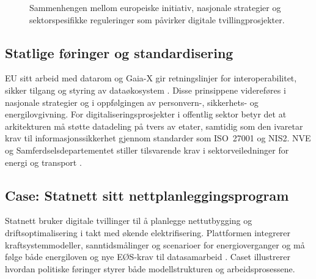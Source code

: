 \begin{figure}[ht]
    \centering
    \resizebox{0.9\textwidth}{!}{}
    \caption{Sammenhengen mellom europeiske initiativ, nasjonale strategier og sektorspesifikke reguleringer som påvirker digitale tvillingprosjekter.}
    \label{fig:kap02-politikk}
\end{figure}

\subsection{Statlige føringer og standardisering}
EU sitt arbeid med datarom og Gaia-X gir retningslinjer for interoperabilitet, sikker tilgang og styring av dataøkosystem \citep{eu2020circulareconomy}. Disse prinsippene videreføres i nasjonale strategier og i oppfølgingen av personvern-, sikkerhets- og energilovgivning. For digitaliseringsprosjekter i offentlig sektor betyr det at arkitekturen må støtte datadeling på tvers av etater, samtidig som den ivaretar krav til informasjonssikkerhet gjennom standarder som ISO~27001 og NIS2. NVE og Samferdselsdepartementet stiller tilsvarende krav i sektorveiledninger for energi og transport \citep{nve2023nettplan,avinor2022digital}.

\subsection{Case: Statnett sitt nettplanleggingsprogram}
Statnett bruker digitale tvillinger til å planlegge nettutbygging og driftsoptimalisering i takt med økende elektrifisering. Plattformen integrerer kraftsystemmodeller, sanntidsmålinger og scenarioer for energioverganger og må følge både energiloven og nye EØS-krav til datasamarbeid \citep{statnett2023digital}. Caset illustrerer hvordan politiske føringer styrer både modellstrukturen og arbeidsprosessene.

